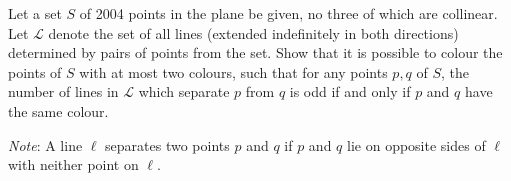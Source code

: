 Let a set $S$ of 2004 points in the plane be given, no three of which are collinear. Let $\mathcal{L}$ denote the set of all lines (extended indefinitely in both directions) determined by pairs of points from the set. Show that it is possible to colour the points of $S$ with at most two colours, such that for any points $p,q$ of $S$, the number of lines in $\mathcal{L}$ which separate $p$ from $q$ is odd if and only if $p$ and $q$ have the same colour.

\emph{Note}: A line $\ell$ separates two points $p$ and $q$ if $p$ and $q$ lie on opposite sides of $\ell$ with neither point on $\ell$.